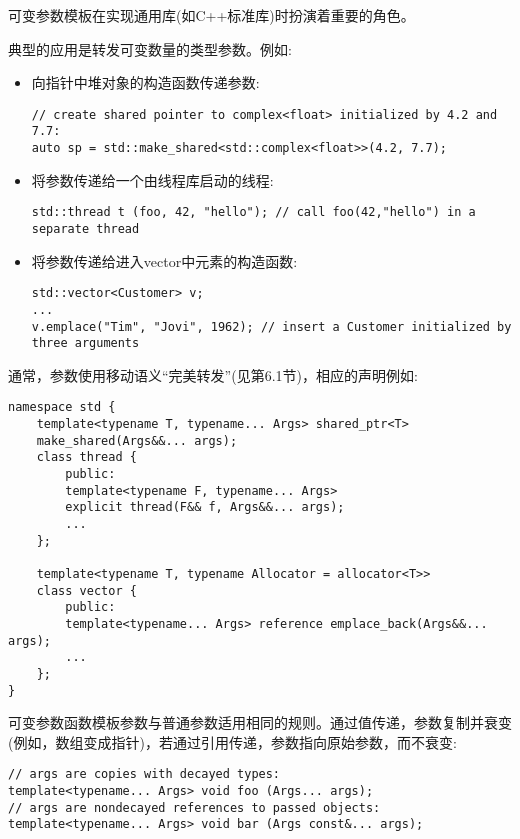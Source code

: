 可变参数模板在实现通用库(如C++标准库)时扮演着重要的角色。

典型的应用是转发可变数量的类型参数。例如:

\begin{itemize}
\item 
向指针中堆对象的构造函数传递参数:
\begin{lstlisting}[style=styleCXX]
// create shared pointer to complex<float> initialized by 4.2 and 7.7:
auto sp = std::make_shared<std::complex<float>>(4.2, 7.7);
\end{lstlisting}

\item 
将参数传递给一个由线程库启动的线程:
\begin{lstlisting}[style=styleCXX]
std::thread t (foo, 42, "hello"); // call foo(42,"hello") in a separate thread
\end{lstlisting}

\item 
将参数传递给进入vector中元素的构造函数:
\begin{lstlisting}[style=styleCXX]
std::vector<Customer> v;
...
v.emplace("Tim", "Jovi", 1962); // insert a Customer initialized by three arguments
\end{lstlisting}

\end{itemize}

通常，参数使用移动语义“完美转发”(见第6.1节)，相应的声明例如:

\begin{lstlisting}[style=styleCXX]
namespace std {
	template<typename T, typename... Args> shared_ptr<T>
	make_shared(Args&&... args);
	class thread {
		public:
		template<typename F, typename... Args>
		explicit thread(F&& f, Args&&... args);
		...
	};

	template<typename T, typename Allocator = allocator<T>>
	class vector {
		public:
		template<typename... Args> reference emplace_back(Args&&... args);
		...
	};
}
\end{lstlisting}

可变参数函数模板参数与普通参数适用相同的规则。通过值传递，参数复制并衰变(例如，数组变成指针)，若通过引用传递，参数指向原始参数，而不衰变:

\begin{lstlisting}[style=styleCXX]
// args are copies with decayed types:
template<typename... Args> void foo (Args... args);
// args are nondecayed references to passed objects:
template<typename... Args> void bar (Args const&... args);
\end{lstlisting}


































